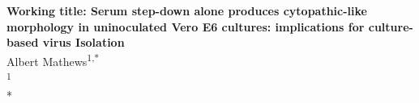 \begin{flushleft}
{\Large\textbf{ Working title: Serum step-down alone produces cytopathic-like morphology in uninoculated Vero E6 cultures: implications for culture-based virus Isolation}}
\\[1em]
Albert Mathews\textsuperscript{1,*}
\\[0.5em]
\textsuperscript{1} 
\\
* 
\end{flushleft}
